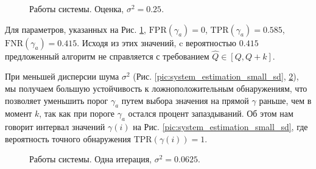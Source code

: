 \documentclass[specialist, substylefile = spbu.rtx,
			   subf, href, 12pt]{disser}
\begin{document}
\begin{figure}[!hhh]
	\caption{Работы системы. Оценка, $ \sigma^2=0.25 $.}
	\label{pic:system_estimation}
\end{figure}

Для параметров, указанных на Рис. \ref{pic:system_estimation}, $ \mathrm{FPR}(\gamma_a) = 0 $, $ \mathrm{TPR}(\gamma_a) = 0.585 $,  $ \mathrm{FNR}(\gamma_a) = 0.415 $. Исходя из этих значений, c вероятностью $ 0.415 $ предложенный алгоритм не справляется с требованием $ \hat{Q} \in [Q, Q+k] $.

При меньшей дисперсии шума $ \sigma^2 $ (Рис. \ref{pic:system_estimation_small_sd}, \ref{pic:system_estimation_small_sd_one_iter}), мы получаем большую устойчивость к ложноположительным обнаружениям, что позволяет уменьшить порог $ \gamma_a $ путем выбора значения на прямой $ \gamma $ раньше, чем в момент $ k $, так как при пороге $ \gamma_a $ остался процент запаздываний. Об этом нам говорит интервал значений $ \gamma(i) $ на Рис. \ref{pic:system_estimation_small_sd}, где вероятность точного обнаружения $ \mathrm{TPR}(\gamma(i)) = 1 $.


\begin{figure}[!hhh]
	\caption{Работы системы. Одна итерация, $ \sigma^2=0.0625 $.}
	\label{pic:system_estimation_small_sd_one_iter}
\end{figure}
\end{document}

